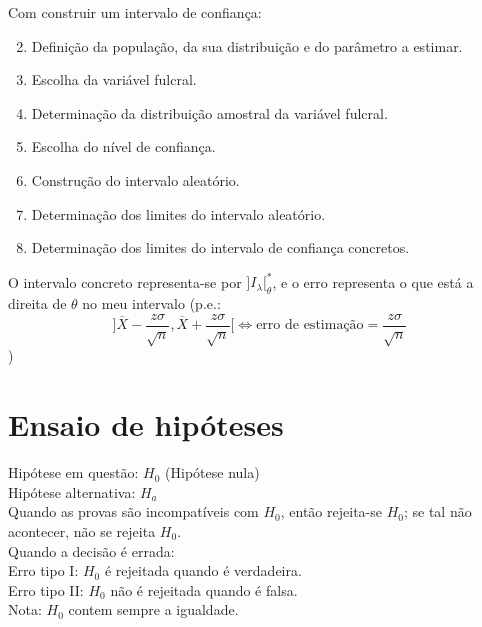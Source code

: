\documentclass[a4paper]{article}
\begin{document}
\begin{multicols}{3}
Com construir um intervalo de confiança:
\begin{enumerate}
  \setcounter{enumi}{1}
  \item Definição da população, da sua distribuição e do parâmetro a estimar.
  \item Escolha da variável fulcral.
  \item Determinação da distribuição amostral da variável fulcral.
  \item Escolha do nível de confiança.
  \item Construção do intervalo aleatório.
  \item Determinação dos limites do intervalo aleatório.
  \item Determinação dos limites do intervalo de confiança concretos.
\end{enumerate}
O intervalo concreto representa-se por $]I_\lambda[^*_\theta$, e o erro representa o que está a direita de $\theta$ no meu intervalo (p.e.: $$]\overline{X} - \frac{z \sigma}{\sqrt{n}}, \overline{X} + \frac{z \sigma}{\sqrt{n}}[ \iff \text{erro de estimação} = \frac{z \sigma}{\sqrt{n}}$$)
\section{Ensaio de hipóteses}
Hipótese em questão: $H_0$ (Hipótese nula) \\
Hipótese alternativa: $H_a$ \\
Quando as provas são incompatíveis com $H_0$, então rejeita-se $H_0$; se tal não acontecer, não se rejeita $H_0$. \\
Quando a decisão é errada: \\
Erro tipo I: $H_0$ é rejeitada quando é verdadeira. \\
Erro tipo II: $H_0$ não é rejeitada quando é falsa. \\
Nota: $H_0$ contem sempre a igualdade. \\

\end{multicols}
\end{document}
